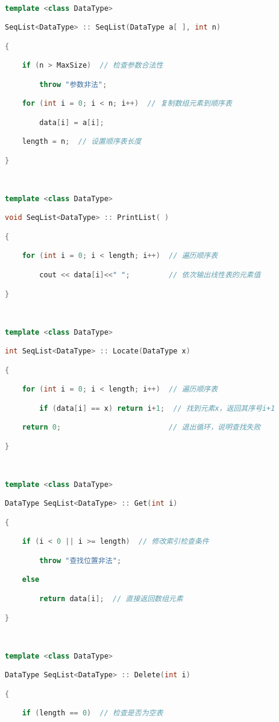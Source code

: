 \begin{lstlisting}[language=C++]
  

template <class DataType>  

SeqList<DataType> :: SeqList(DataType a[ ], int n)

{

    if (n > MaxSize)  // 检查参数合法性

        throw "参数非法";

    for (int i = 0; i < n; i++)  // 复制数组元素到顺序表

        data[i] = a[i];

    length = n;  // 设置顺序表长度

}

  

template <class DataType>  

void SeqList<DataType> :: PrintList( )

{

    for (int i = 0; i < length; i++)  // 遍历顺序表

        cout << data[i]<<" ";         // 依次输出线性表的元素值

}

  

template <class DataType>  

int SeqList<DataType> :: Locate(DataType x)

{

    for (int i = 0; i < length; i++)  // 遍历顺序表

        if (data[i] == x) return i+1;  // 找到元素x，返回其序号i+1

    return 0;                         // 退出循环，说明查找失败

}

  

template <class DataType>  

DataType SeqList<DataType> :: Get(int i)

{

    if (i < 0 || i >= length)  // 修改索引检查条件

        throw "查找位置非法";

    else

        return data[i];  // 直接返回数组元素

}

  

template <class DataType>  

DataType SeqList<DataType> :: Delete(int i)

{

    if (length == 0)  // 检查是否为空表


\end{lstlisting}
